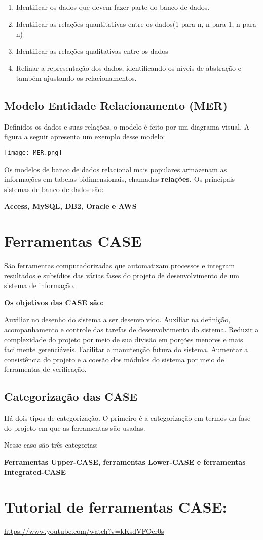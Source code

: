 \documentclass[12pt]{article}
\begin{document}
\begin{enumerate}[label=\textbf{\arabic*}.]
    \item Identificar os dados que devem fazer parte do banco de dados.
    \item Identificar as relações quantitativas entre os dados(1 para n, n para 1, n para n)
    \item Identificar as relações qualitativas entre os dados
    \item Refinar a representação dos dados, identificando os níveis de abstração e também ajustando os relacionamentos.
\end{enumerate}

\indent
\subsection{Modelo Entidade Relacionamento (MER)}
Definidos os dados e suas relações, o modelo é feito por um diagrama visual.
A figura a seguir apresenta um exemplo desse modelo:

\hspace{5cm}\texttt{[image: MER.png]}

Os modelos de banco de dados relacional mais populares armazenam as informações
em tabelas bidimensionais, chamadas \textbf{relações.} Os principais sistemas de banco 
de dados são: 

\textbf{Access, MySQL, DB2, Oracle e AWS}

\indent
\section{Ferramentas CASE}
São ferramentas computadorizadas que automatizam processos e integram resultados
e subsídios das várias fases do projeto de desenvolvimento de um sistema de informação.

\textbf{Os objetivos das CASE são:}

Auxiliar no desenho do sistema a ser desenvolvido. Auxiliar na definição, acompanhamento
e controle das tarefas de desenvolvimento do sistema. Reduzir a complexidade do projeto
por meio de sua divisão em porções menores e mais facilmente gerenciáveis.
Facilitar a manutenção futura do sistema. Aumentar a consistência do projeto e a coesão
dos módulos do sistema por meio de ferramentas de verificação.

\subsection{Categorização das CASE}
Há dois tipos de categorização. O primeiro é a categorização em termos da fase do projeto
em que as ferramentas são usadas. 

Nesse caso são três categorias:

\textbf{Ferramentas Upper-CASE, ferramentas Lower-CASE e ferramentas Integrated-CASE}

\section*{Tutorial de ferramentas CASE:}

\url{https://www.youtube.com/watch?v=kKsdVFOcr0s}
\end{document}
